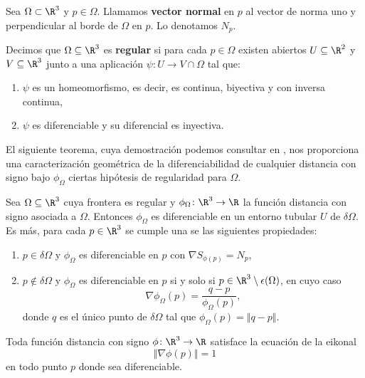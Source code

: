\begin{definicion}
    Sea $\Omega \subset \R^3$ y $p\in \Omega$. Llamamos \textbf{vector normal} en $p$ al vector de norma uno y perpendicular al borde de $\Omega$ en $p$. Lo denotamos $N_p$.
\end{definicion}

\begin{definicion}
    Decimos que $\Omega \subseteq \R^3$ es \textbf{regular} si para cada $p\in \Omega$ existen abiertos $U\subseteq \R^2$ y $V\subseteq \R^3$ junto a una aplicación $\psi\colon U \to V\cap \Omega$ tal que:
    \begin{enumerate}
        \item $\psi$ es un homeomorfismo, es decir, es continua, biyectiva y con inversa continua,
        \item $\psi$ es diferenciable y su diferencial es inyectiva.
    \end{enumerate}
\end{definicion}

El siguiente teorema, cuya demostración podemos consultar en \cite{dif1}, nos proporciona una caracterización geométrica de la diferenciabilidad de cualquier distancia con signo bajo $\phi_{\Omega}$ ciertas hipótesis de regularidad para $\Omega$.
\begin{teorema}\label{teo:diff}
    Sea $\Omega \subseteq \R^3$ cuya frontera es regular y $\phi_{\Omega} \colon \R^3\to \R$ la función distancia con signo asociada a $\Omega$. Entonces $\phi_{\Omega}$ es diferenciable en un entorno tubular $U$ de $\delta \Omega$. Es más, para cada $p\in \R^3$ se cumple una se las siguientes propiedades:
    \begin{enumerate}
        \item $p\in \delta \Omega$ y $\phi_{\Omega}$ es diferenciable en $p$ con $\nabla S_{\phi(p)} = N_p$,
        \item $p\notin \delta \Omega$ y $\phi_{\Omega}$ es diferenciable en $p$ si y solo si $p\in \R^3\setminus \epsilon(\Omega)$, en cuyo caso
        \begin{equation*}
            \nabla \phi_{\Omega}(p) = \frac{q-p}{\phi_{\Omega}(p)},
        \end{equation*}
        donde $q$ es el único punto de $\delta\Omega$ tal que $\phi_{\Omega}(p) = \Vert q-p\Vert$.
    \end{enumerate}
\end{teorema}

\begin{corolario}
    Toda función distancia con signo $\phi\colon \R^3\to \R$ satisface la ecuación de la eikonal 
    \begin{equation*}
        \Vert \nabla \phi(p)\Vert = 1
    \end{equation*}
    en todo punto $p$ donde sea diferenciable.
\end{corolario}
    
